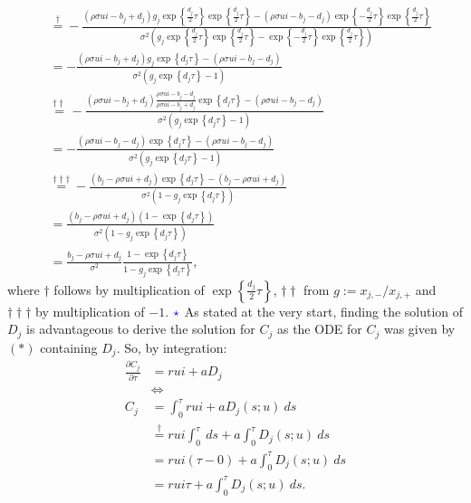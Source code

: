 \documentclass[11pt]{article}
\numberwithin{equation}{section}
\begin{document}
\begin{align*}
    & \overset{\dagger}{=}-\frac{\left(\rho \sigma u i-b_j+d_j\right) g_j \exp\left\{\frac{d_j}{2} \tau\right\} \exp\left\{\frac{d_j}{2} \tau\right\}-\left(\rho \sigma u i-b_j-d_j\right) \exp\left\{-\frac{d_j}{2} \tau\right\} \exp\left\{\frac{d_j}{2} \tau\right\}}{\sigma^2\left(g_j \exp\left\{\frac{d_j}{2} \tau\right\} \exp\left\{\frac{d_j}{2} \tau\right\}-\exp\left\{-\frac{d_j}{2} \tau\right\} \exp\left\{\frac{d_j}{2} \tau\right\}\right)} \\
    & =-\frac{\left(\rho \sigma u i-b_j+d_j\right) g_j \exp\left\{d_j \tau\right\}-\left(\rho \sigma u i-b_j-d_j\right)}{\sigma^2\left(g_j \exp\left\{d_j \tau\right\}-1\right)} \\
    & \overset{\dagger\dagger}{=}-\frac{\left(\rho \sigma u i-b_j+d_j\right) \frac{\rho \sigma u i-b_j-d_j}{\rho \sigma u i-b_j+d_j} \exp\left\{d_j \tau\right\}-\left(\rho \sigma u i-b_j-d_j\right)}{\sigma^2\left(g_j \exp\left\{d_j \tau\right\}-1\right)} \\
    & =-\frac{\left(\rho \sigma u i-b_j-d_j\right) \exp\left\{d_j \tau\right\}-\left(\rho \sigma u i-b_j-d_j\right)}{\sigma^2\left(g_j \exp\left\{d_j \tau\right\}-1\right)} \\
    & \overset{\dagger\dagger\dagger}{=}-\frac{\left(b_j-\rho \sigma u i+d_j\right) \exp\left\{d_j \tau\right\}-\left(b_j-\rho \sigma u i+d_j\right)}{\sigma^2\left(1-g_j \exp\left\{d_j \tau\right\}\right)} \\
    & =\frac{\left(b_j-\rho \sigma u i+d_j\right)\left(1-\exp\left\{d_j \tau\right\}\right)}{\sigma^2\left(1-g_j \exp\left\{d_j \tau\right\}\right)} \\
    & =\frac{b_j-\rho \sigma u i + d_j}{\sigma^2} \frac{1-\exp\left\{d_j \tau\right\}}{1-g_j \exp\left\{d_j \tau\right\}},
\end{align*}
where $\dagger$ follows by multiplication of $\exp{\left \{\frac{d_j}{2}\tau
\right \}}$, $\dagger\dagger$ from $g:=x_{j,-}/x_{j,+}$ and
$\dagger\dagger\dagger$ by multiplication of $-1$.
\newpage
$\textcolor{blue}{\star}$  As stated at the very start, finding the solution of
$D_j$ is advantageous to derive the solution for $C_j$ as the ODE for $C_j$ was
given by $(*)$ containing $D_j$. So, by integration:
\begin{align*}
    \frac{\partial C_j}{\partial \tau}&=rui+aD_j\\
    &\iff\\
    C_j&=\int_0^\tau rui+aD_j(s;u)\:ds\\
    &\overset{\dagger}{=}rui\int_0^\tau \:ds+a\int_0^\tau D_j(s;u)\:ds\\
    &=rui \left ( \tau-0 \right )+a\int_0^\tau D_j(s;u)\:ds\\
    &=rui\tau+a\int_0^\tau D_j(s;u)\:ds.
\end{align*}
\end{document}
